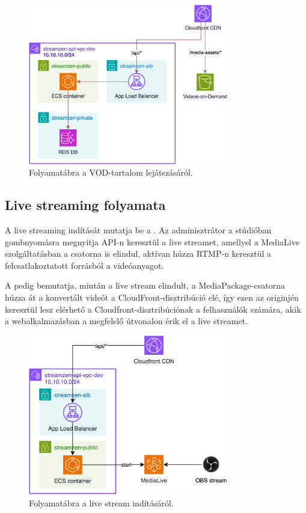 \begin{figure}
	\centering
	\includegraphics[height=70mm, keepaspectratio]{figures/dipterv_vod3.png}
	\caption{Folyamatábra a VOD-tartalom lejátszásáról.}
	\label{fig:vod3}
\end{figure}

\subsection{Live streaming folyamata}

A live streaming indítását mutatja be a . Az adminisztrátor a stúdióban gombnyomásra megnyitja API-n keresztül a live streamet, amellyel a MediaLive szolgáltatásban a csatorna is elindul, aktívan húzza RTMP-n keresztül a felcsatlakoztatott forrásból a videóanyagot.

A  pedig bemutatja, miután a live stream elindult, a MediaPackage-csatorna húzza át a konvertált videót a CloudFront-disztribúció elé, így ezen az originjén keresztül lesz elérhető a Cloudfront-disztribúciónak a felhasználók számára, akik a webalkalmazásban a megfelelő útvonalon érik el a live streamet.

\begin{figure}[h]
	\centering
	\includegraphics[height=70mm, keepaspectratio]{figures/dipterv_live1.png}
	\caption{Folyamatábra a live stream indításáról.}
	\label{fig:live1}
\end{figure}

